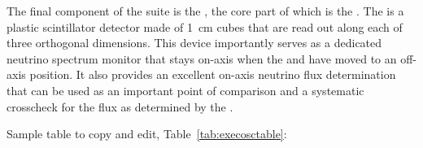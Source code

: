 The final component of the   suite is the %
,  the core part of which is the .  The  is a plastic scintillator detector made of \SI{1}{cm} cubes that are read out along each of three orthogonal dimensions.  %
This device importantly serves as a dedicated  neutrino spectrum monitor that stays on-axis when the   and  have moved to an off-axis position. 
It also provides an excellent on-axis neutrino flux determination that can be used as an important point of comparison and a systematic crosscheck for the flux as determined by the .
















Sample table to copy and edit, Table~\ref{tab:execosctable}:

